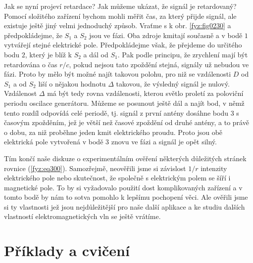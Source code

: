     Jak se nyní projeví retardace? Jak můžeme ukázat, že signál je retardovaný? Pomocí složitého 
    zařízení bychom mohli měřit čas, za který přijde signál, ale existuje ještě jiný velmi 
    jednoduchý způsob. Vraťme s k obr. \ref{fyz:fig0230} a předpokládejme, že \(S_1\) a \(S_2\) jsou 
    ve fázi. Oba zdroje kmitají současně a v bodě \(1\) vytvářejí stejné elektrické pole. 
    Předpokládejme však, že přejdeme do určitého bodu \(2\), který je blíž k \(S_2\) a dál od 
    \(S_1\). Pak podle principu, že zrychlení mají být retardována o čas \(r/c\), pokud nejsou tato 
    zpoždění stejná, signály už nebudou ve fázi. Proto by mělo být možné najít takovou polohu, pro 
    niž se vzdálenosti \(D\) od \(S_1\) a od \(S_2\) liší o nějakou hodnotu \(\Delta\) takovou, že 
    výsledný signál je nulový. Vzdálenost \(\Delta\) má být tedy rovna vzdálenosti, kterou světlo 
    proletí za poloviční periodu oscilace generátoru. Můžeme se posunout ještě dál a najít bod, v 
    němž tento rozdíl odpovídá celé periodě, tj. signál z první antény dosáhne bodu \(3\) s časovým 
    zpožděním, jež je větší než časové zpoždění od druhé antény, a to právě o dobu, za niž     
    proběhne jeden kmit elektrického proudu. Proto jsou obě elektrická pole vytvořená v bodě \(3\) 
    znovu ve fázi a signál je opět silný.
    
    Tím končí naše diskuze o experimentálním ověření některých důležitých stránek rovnice 
    (\ref{fyz:eq300}). Samozřejmě, neověřili jsme si závislost \(1/r\) intenzity elektrického pole 
    nebo skutečnost, že společně s elektrickým polem se šíří i magnetické pole. To by si vyžadovalo 
    použití dost komplikovaných zařízení a v tomto bodě by nám to sotva pomohlo k lepšímu pochopení 
    věci. Ale ověřili jsme si ty vlastnosti jež jsou nejdůležitější pro naše další aplikace a ke 
    studiu dalších vlastností elektromagnetických vln se ještě vrátíme.
    
  \section{Příklady a cvičení}\label{fyz:IchapXXVIIIsecV}

